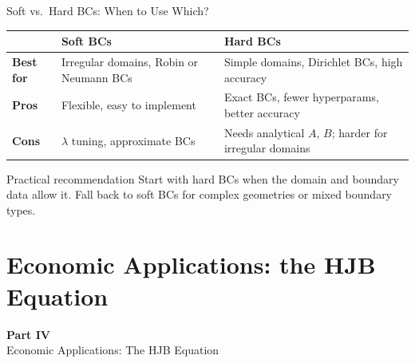 \documentclass[aspectratio=169,11pt]{beamer}
\newcommand{\emphc}[1]{\textcolor{harvardcrimson}{#1}}
\begin{document}
\begin{frame}{Soft vs.\ Hard BCs: When to Use Which?}
\begin{center}
{\small
\begin{tabular}{p{2.2cm}>{\raggedright\arraybackslash}p{4.5cm}>{\raggedright\arraybackslash}p{4.5cm}}
\toprule
& \textbf{Soft BCs} & \textbf{Hard BCs} \\
\midrule
\textbf{Best for} & Irregular domains, Robin or Neumann BCs & Simple domains, Dirichlet BCs, high accuracy \\
\midrule
\textbf{Pros} & Flexible, easy to implement & Exact BCs, fewer hyperparams, better accuracy \\
\midrule
\textbf{Cons} & $\lambda$ tuning, approximate BCs & Needs analytical $A$, $B$; harder for irregular domains \\
\bottomrule
\end{tabular}
}
\end{center}

\vspace{0.3em}
\begin{block}{Practical recommendation}
Start with \emphc{hard BCs} when the domain and boundary data allow it.
Fall back to \emphc{soft BCs} for complex geometries or mixed boundary types.
\end{block}
\end{frame}


\section{Economic Applications: the HJB Equation}

\begin{frame}{}
\vfill
\begin{center}
{\Huge \textcolor{uzhblue}{\textbf{Part IV}}}\\[12pt]
{\LARGE Economic Applications: The HJB Equation}
\end{center}
\vfill
\end{frame}
\end{document}
